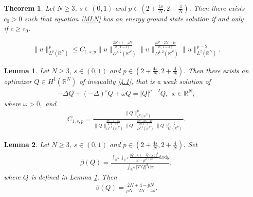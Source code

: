 \documentclass[10pt,a4paper]{amsart}
\newtheorem{theorem}{Theorem}
\newtheorem{lemma}{Lemma}
\begin{document}
\begin{theorem}\label{Theorem1.1}
Let $N\geqslant3$, $s\in(0,1)$ and  $p\in(2+\frac{4s}{N},2+\frac{4}{N})$.
Then there exists $c_{0}>0$ such that equation \eqref{MLN} has an energy ground state solution if and only if $c\geqslant c_{0}$.
\end{theorem}

\begin{equation}\label{4.1}
\begin{aligned}
\|u\|_{L^{p}(\mathbb{R}^{N})}^{p}
\leqslant C_{1,s,p}
\|u\|_{D^{s,2}(\mathbb{R}^{N})}^{\frac{2N+4-pN}{2(1-s)}}
\|u\|_{D^{1,2}(\mathbb{R}^{N})}^{\frac{pN-2N-4s}{2(1-s)}}
\|u\|_{L^{2}(\mathbb{R}^{N})}^{p-2}.
\end{aligned}
\end{equation}

\begin{lemma}\label{Lemma4.2}
Let $N\geqslant 3$, $s\in(0,1)$ and $p \in(2+\frac{4s}{N},2+\frac{4}{N})$.
Then there exists an optimizer $Q\in H^{1}(\mathbb{R}^{N})$ of inequality \eqref{4.1},
that is a weak solution of
\begin{equation}\label{4.4}
\begin{aligned}
-\Delta Q
+(-\Delta)^{s}Q+\omega Q=|Q|^{p-2}Q, \ \ x\in \mathbb{R}^{N},
\end{aligned}
\end{equation}
where $\omega>0,$ and
\begin{equation*}
\begin{aligned}
C_{1,s,p}
=
\frac
{\|Q\|_{L^{p}(\mathbb{R}^{N})}^{p}}
{
\|Q\|_{D^{s,2}(\mathbb{R}^{N})}^{\frac{2N+4-pN}{2(1-s)}}
\|Q\|_{D^{1,2}(\mathbb{R}^{N})}^{\frac{pN-2N-4s}{2(1-s)}}
\|Q\|_{L^{2}(\mathbb{R}^{N})}^{p-2}
}.
\end{aligned}
\end{equation*}
\end{lemma}

\begin{lemma}\label{Lemma5.1}
Let $N\geqslant 3$, $s\in(0,1)$ and $p \in(2+\frac{4s}{N},2+\frac{4}{N})$.
Set
\begin{equation*}
\begin{aligned}
\beta(Q)=\frac{\int_{\mathbb{R}^{N}}\int_{\mathbb{R}^{N}}\frac{|Q(x)-Q(y)|^{2}}{|x-y|^{N+2s}}\mathrm{d}x\mathrm{d}y}
{\int_{\mathbb{R}^{N}}|\nabla Q|^{2}\mathrm{d}x},
\end{aligned}
\end{equation*}
where $Q$ is defined in Lemma \ref{Lemma4.2}.
Then
\begin{equation*}
\begin{aligned}
\beta(Q)=\frac{2N+4-pN}{pN-2N-4s}.
\end{aligned}
\end{equation*}
\end{lemma}
\end{document}
